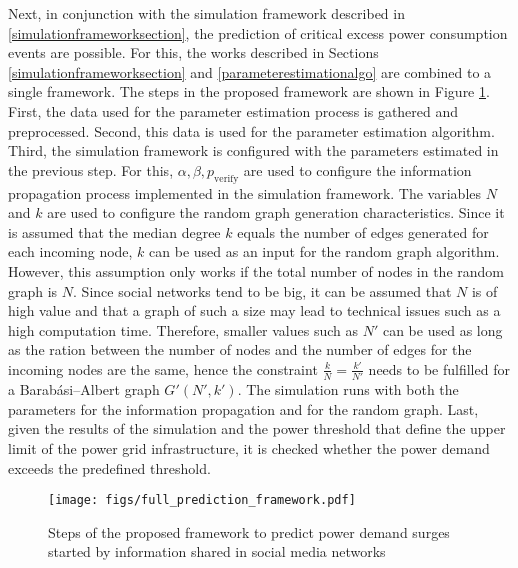 Next, in conjunction with the simulation framework described in 
\ref{simulationframeworksection}, the prediction of
critical excess power consumption events are possible. 
For this, the works described in Sections \ref{simulationframeworksection} 
and \ref{parameterestimationalgo} are combined to a single framework.
The steps in the proposed framework are shown in 
Figure \ref{basicpredicitonframework}.
First, the data used for the parameter estimation process is gathered and
preprocessed. Second, this data is used for the parameter estimation algorithm. 
Third, the simulation framework is configured
with the parameters estimated in the previous step. For this, 
$\alpha, \beta, p_{{\mathrm{verify}}}$ 
are used to configure the 
information propagation process implemented in the simulation framework.
The variables $N$ and $k$ are used to configure the random graph generation
characteristics. Since it is assumed that the median degree
$k$ equals the number of edges generated for each incoming node,
$k$ can be used as an input for the random graph algorithm. 
However, this assumption
only works if the total number of nodes in the random graph is $N$.
Since social networks tend to be big, it can be assumed that 
$N$ is of high value and that a graph of such a size may lead to technical 
issues such as a high computation time. Therefore, smaller values such as $N'$
can be used as long as the ration between the number of nodes and the
number of edges for the incoming nodes are the same, hence the constraint
$\frac{k}{N}=\frac{k'}{N'}$ needs to be fulfilled for a Barabási–Albert
graph $G'(N',k')$. The simulation runs with both
the parameters for the information propagation and for the random graph. 
Last, given the results of the simulation and the power threshold
that define the upper limit of the power grid infrastructure, it
is checked whether the power demand exceeds the predefined threshold.


\begin{figure}[!ht]
    \center
    \texttt{[image: figs/full\_prediction\_framework.pdf]}
    \caption{Steps of the proposed framework to predict power demand surges
    started by information shared in social media networks}
    \label{basicpredicitonframework}
\end{figure}


